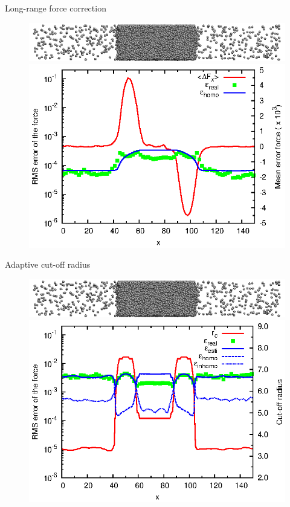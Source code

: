 \documentclass{beamer}
\begin{document}
\begin{frame}{Long-range force correction}
  \begin{figure}
    \centering
    \includegraphics[scale=1]{figs/t0.85-n16000-rc07.5uni/confout-02.eps}\\
    \includegraphics[]{figs/t0.85-n16000-fcorr-rc07.5-feq0200/fcorr-and-error.eps}
  \end{figure}
\end{frame}

\begin{frame}{Adaptive cut-off radius}
  \begin{figure}
    \centering
    \includegraphics[scale=1]{figs/t0.85-n16000-rc07.5uni/confout-02.eps}\\
    \includegraphics[]{figs/t0.85-n16000-adapt-e0.0045-extend/rcut-and-error.eps}
  \end{figure}
\end{frame}
\end{document}
